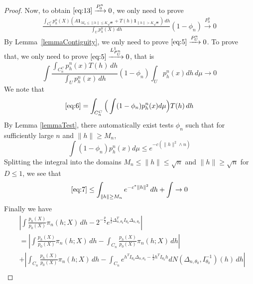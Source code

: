 \begin{proof}
Now, to obtain $\eqref{eq:13}\xrightarrow{P_0^n}0$, we only need to prove
\begin{equation}\label{eq:5}
    \begin{aligned}
        \frac{\int_{C_n^C}p_h^n(X)(A\textbf{1}_{M_n\leq \|h\|\leq K\sqrt{n}}+T(h)\textbf{1}_{\|h\|> K\sqrt{n}})\, dh}{\int_U p_h^n(X)\, dh}(1-\phi_n)\xrightarrow{P_0^n} 0
    \end{aligned}
\end{equation}
By Lemma~\ref{lemmaContiguity}, we only need to prove $\eqref{eq:5}\xrightarrow{P_U^n}0$. To prove that, we only need to prove $\eqref{eq:5}\xrightarrow{L^1_{P_U^n}}0$, that is 
\begin{equation}\label{eq:6}
    \int \frac{\int_{C_n^C}p_h^n(x)T(h)\, dh}{\int_U p_h^n(x)\, dh}(1-\phi_n)\int_U p_h^n(x)dh \, d\mu  \to 0
\end{equation}
We note that
\begin{equation}\label{eq:7}
    \eqref{eq:6}=\int_{C_n^C} \Big(\int (1-\phi_n)p_h^n(x)d\mu\Big) T(h)\, dh 
\end{equation}
By Lemma \ref{lemmaTest}, there automatically exist tests $\phi_n$  such that for sufficiently large $n$ and $\|h\|\geq M_n$,
\begin{equation}
\int (1-\phi_n)p^n_h(x)d\mu\leq e^{-c(\|h\|^2\wedge n)}
\end{equation}
Splitting the integral into the domains $M_n\leq \|h\|\leq \sqrt{n}$ and $\|h\|\geq \sqrt{n}$ for $D\leq 1$, we see that
\begin{equation}
\eqref{eq:7}\leq \int_{\|h\|\geq M_n}e^{-c^*\|h\|^2}\, dh +\int  \to 0
\end{equation}
Finally we have
\begin{equation}
    \begin{aligned}
        &\left|\int \frac{p_h(X)}{p_0(X)}\pi_n (h;X) \, dh-2^{-\frac{p}{2}}e^{\frac{1}{2}\Delta_{n,\theta_0}^TI_{\theta_0}\Delta_{n,\theta_0}}
 \right|\\
        &=\left|\int \frac{p_h(X)}{p_0(X)}\pi_n (h;X) \, dh-\int_{C_n} \frac{p_h(X)}{p_0(X)}\pi_n (h;X) \, dh\right|\\
        &+\left|\int_{C_n} \frac{p_h(X)}{p_0(X)}\pi_n (h;X) \, dh -\int_{C_n} e^{h^TI_{\theta_0}\Delta_{n,\theta_0}-\frac{1}{2}h^TI_{\theta_0}h}dN(\Delta_{n,\theta_0},I_{\theta_0}^{-1})(h)\, dh\right|\\

\end{aligned}
\end{equation}
\end{proof}
